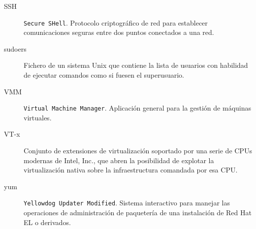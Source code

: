 \begin{description}
\item[SSH] \texttt{Secure SHell}. Protocolo criptogr\'afico de red para establecer comunicaciones seguras entre dos puntos conectados a una red.
\item[sudoers] Fichero de un sistema Unix que contiene la lista de usuarios con habilidad de ejecutar comandos como si fuesen el superusuario.
\item[VMM] \texttt{Virtual Machine Manager}. Aplicaci\'on general para la gesti\'on de m\'aquinas virtuales.
\item[VT-x] Conjunto de extensiones de virtualizaci\'on soportado por una serie de CPUs modernas de Intel, Inc., que abren la posibilidad de explotar la virtualizaci\'on nativa sobre la infraestructura comandada por esa CPU.
\item[yum] \texttt{Yellowdog Updater Modified}. Sistema interactivo para manejar las operaciones de administraci\'on de paqueter\'ia de una instalaci\'on de Red Hat EL o derivados.
\end{description}

